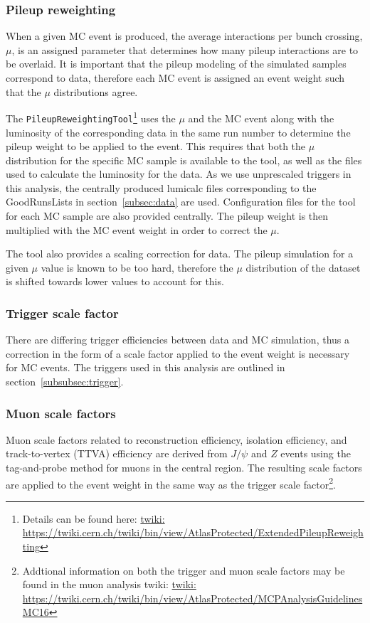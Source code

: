 \subsubsection{Pileup reweighting}
\label{subsec:PRW}
When a given MC event is produced, the average interactions per bunch crossing, $\mu$, is an assigned parameter that determines how many pileup interactions are to be overlaid.
It is important that the pileup modeling of the simulated samples correspond to data, therefore each MC event is assigned an event weight such that the $\mu$ distributions agree.

The \texttt{PileupReweightingTool}\footnote{Details can be found here: \url{twiki: https://twiki.cern.ch/twiki/bin/view/AtlasProtected/ExtendedPileupReweighting}} uses the $\mu$ and the MC event along with the luminosity of the corresponding data in the same run number to determine the pileup weight to be applied to the event.
This requires that both the $\mu$ distribution for the specific MC sample is available to the tool, as well as the files used to calculate the luminosity for the data. As we use unprescaled triggers in this analysis, the centrally produced lumicalc files corresponding to the GoodRunsLists in section~\ref{subsec:data} are used.
Configuration files for the tool for each MC sample are also provided centrally.
The pileup weight is then multiplied with the MC event weight in order to correct the $\mu$.

The tool also provides a scaling correction for data. The pileup simulation for a given $\mu$ value is known to be too hard, therefore the $\mu$ distribution of the dataset is shifted towards lower values to account for this.

\subsubsection{Trigger scale factor}
There are differing trigger efficiencies between data and MC simulation, thus a correction in the form of a scale factor applied to the event weight is necessary for MC events. The triggers used in this analysis are outlined in section~\ref{subsubsec:trigger}.

\subsubsection{Muon scale factors}
Muon scale factors related to reconstruction efficiency, isolation efficiency, and track-to-vertex (TTVA) efficiency are derived from $J/\psi$ and $Z$ events using the tag-and-probe method for muons in the central region. The resulting scale factors are applied to the event weight in the same way as the trigger scale
factor\footnote{Addtional information on both the trigger and muon scale factors may be found in the muon analysis twiki: \url{twiki: https://twiki.cern.ch/twiki/bin/view/AtlasProtected/MCPAnalysisGuidelinesMC16}}.
